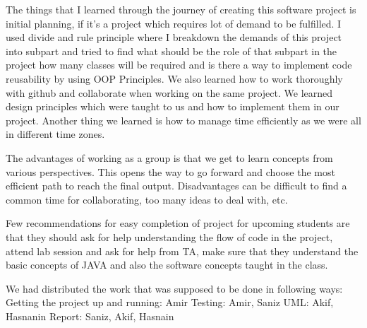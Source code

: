 \documentclass[12pt, dvipsnames, a4paper]{article}
\begin{document}
The things that I learned through the journey of creating this software project is initial planning, if it’s a project which requires lot of demand to be fulfilled. I used divide and rule principle where I breakdown the demands of this project into subpart and tried to find what should be the role of that subpart in the project how many classes will be required and is there a way to implement code reusability by using OOP Principles. We also learned how to work thoroughly with github and collaborate when working on the same project. We learned design principles which were taught to us and how to implement them in our project. Another thing we learned is how to manage time efficiently as we were all in different time zones. 

The advantages of working as a group is that we get to learn concepts from various perspectives. This opens the way to go forward and choose the most efficient path to reach the final output. Disadvantages can be difficult to find a common time for collaborating, too many ideas to deal with, etc.

Few recommendations for easy completion of project for upcoming students are that they should ask for help understanding the flow of code in the project, attend lab session and ask for help from TA, make sure that they understand the basic concepts of JAVA and also the software concepts taught in the class.

We had distributed the work that was supposed to be done in following ways: 
Getting the project up and running: Amir
Testing: Amir, Saniz
UML: Akif, Hasnanin
Report: Saniz, Akif, Hasnain
\end{document}

